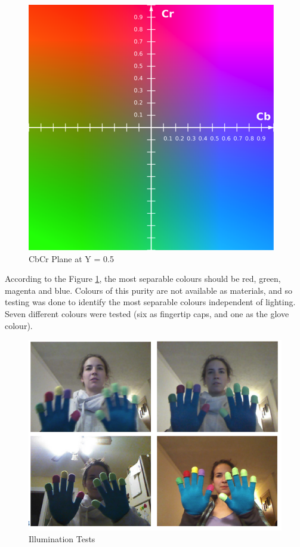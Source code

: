 \documentclass[12pt]{article}
\begin{document}
\begin{figure}[H]
  \centering
  \includegraphics[scale=1]{YUV.png}
  \caption{CbCr Plane at Y = 0.5}
  \label{fig:YUV}
\end{figure}

According to the Figure \ref{fig:YUV}, the most separable colours should be red, green, magenta and blue. Colours of this purity are not available as materials, and so testing was done to identify the most separable colours independent of lighting. Seven different colours were tested (six as fingertip caps, and one as the glove colour).

\begin{figure}[H]
  \centering
  \includegraphics[scale=0.75]{LightTest.png}
  \caption{Illumination Tests}
  \label{fig:light}
\end{figure}
\end{document}

